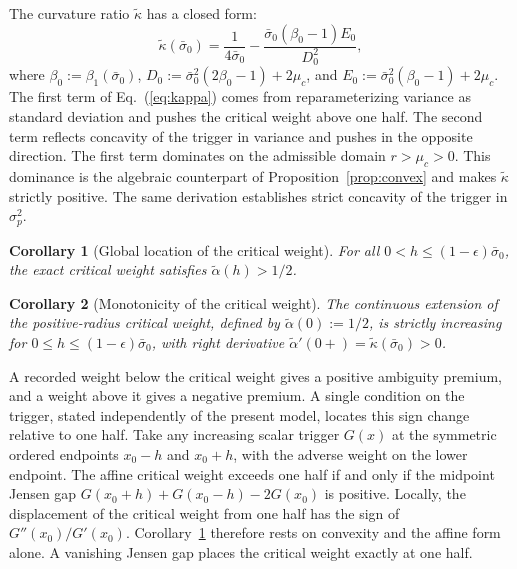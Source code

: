 \documentclass[5p,times,authoryear]{elsarticle}
\theoremstyle{plain}
\newtheorem{corollary}{Corollary}
\newcommand{\sbar}{\bar{\sigma}_0}
\begin{document}
The curvature ratio $\tilde{\kappa}$ has a closed form:
\begin{equation}
\tilde{\kappa}(\sbar)=\frac{1}{4\sbar}-\frac{\sbar(\beta_0-1)E_0}{D_0^{2}},
\label{eq:kappa}
\end{equation}
where $\beta_0:=\beta_1(\sbar)$, $D_0:=\sbar^{2}(2\beta_0-1)+2\mu_c$, and $E_0:=\sbar^{2}(\beta_0-1)+2\mu_c$. The first term of Eq.~(\ref{eq:kappa}) comes from reparameterizing variance as standard deviation and pushes the critical weight above one half. The second term reflects concavity of the trigger in variance and pushes in the opposite direction. The first term dominates on the admissible domain $r>\mu_c>0$. This dominance is the algebraic counterpart of Proposition~\ref{prop:convex} and makes $\tilde{\kappa}$ strictly positive. The same derivation establishes strict concavity of the trigger in $\sigma_p^{2}$.

\begin{corollary}[Global location of the critical weight]\label{cor:global}
For all $0<h\le(1-\epsilon)\sbar$, the exact critical weight satisfies $\tilde{\alpha}(h)>1/2$.
\end{corollary}

\begin{corollary}[Monotonicity of the critical weight]\label{cor:mono}
The continuous extension of the positive-radius critical weight, defined by $\tilde{\alpha}(0):=1/2$, is strictly increasing for $0\le h\le(1-\epsilon)\sbar$, with right derivative $\tilde{\alpha}'(0+)=\tilde{\kappa}(\sbar)>0$.
\end{corollary}

A recorded weight below the critical weight gives a positive ambiguity premium, and a weight above it gives a negative premium. A single condition on the trigger, stated independently of the present model, locates this sign change relative to one half. Take any increasing scalar trigger $G(x)$ at the symmetric ordered endpoints $x_0-h$ and $x_0+h$, with the adverse weight on the lower endpoint. The affine critical weight exceeds one half if and only if the midpoint Jensen gap $G(x_0+h)+G(x_0-h)-2G(x_0)$ is positive. Locally, the displacement of the critical weight from one half has the sign of $G''(x_0)/G'(x_0)$. Corollary~\ref{cor:global} therefore rests on convexity and the affine form alone. A vanishing Jensen gap places the critical weight exactly at one half.
\end{document}
